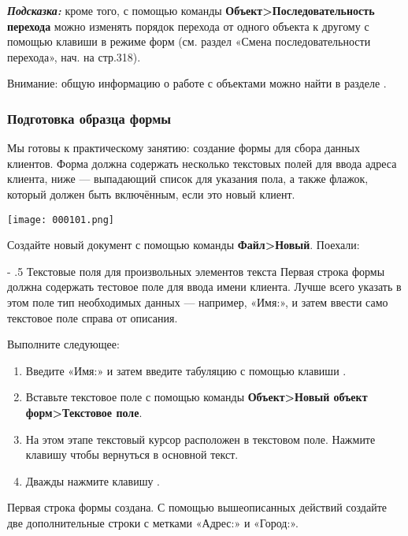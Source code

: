 ﻿\documentclass[a4paper,10pt]{article}
\makeatletter
\renewcommand\paragraph{%
   \@startsection{paragraph}{4}{0mm}%
      {-\baselineskip}%
      {.5\baselineskip}%
      {\normalfont\normalsize\bfseries}}
\makeatother
\begin{document}
\begin{mdframed}[backgroundcolor=blue!10]
\textbf{\textit{Подсказка:}} кроме того, с помощью команды \textbf{Объект>Последовательность перехода} можно изменять порядок перехода от одного объекта к другому с помощью клавиши  в режиме форм (см. раздел «Смена последовательности перехода», нач. на стр.318).
\end{mdframed}

Внимание: общую информацию о работе с объектами можно найти в разделе .

\subsubsection{Подготовка образца формы}
Мы готовы к практическому занятию: создание формы для сбора данных клиентов. Форма должна содержать несколько текстовых полей для ввода адреса клиента, ниже — выпадающий список для указания пола, а также флажок, который должен быть включённым, если это новый клиент.

\texttt{[image: 000101.png]}

Создайте новый документ с помощью команды \textbf{Файл>Новый}. Поехали:

\paragraph{Текстовые поля для произвольных элементов текста}
Первая строка формы должна содержать тестовое поле для ввода имени клиента. Лучше всего указать в этом поле тип необходимых данных — например, «Имя:», и затем ввести само текстовое поле справа от описания.

Выполните следующее:

\begin{enumerate}
 \item Введите «Имя:» и затем введите табуляцию с помощью клавиши .
 \item Вставьте текстовое поле с помощью команды \textbf{Объект>Новый объект форм>Текстовое поле}.
 \item На этом этапе текстовый курсор расположен в текстовом поле. Нажмите клавишу \keys{\arrowkeyright} чтобы вернуться в основной текст.
 \item Дважды нажмите клавишу .
 \end{enumerate}

 Первая строка формы создана. С помощью вышеописанных действий создайте две дополнительные строки с метками «Адрес:» и «Город:».
 
\end{document}
